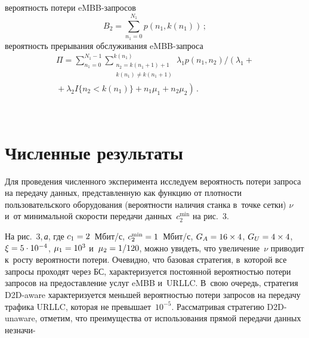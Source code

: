 \begin{multicols}{2}
\noindent
 ве\-ро\-ят\-ность потери eMBB-за\-про\-сов 
 $$
 B_2 = 
\sum\limits_{n_1=0}^{N_1}{p(n_1, k(n_1))}\,;
$$
 ве\-ро\-ят\-ность прерывания обслуживания eMBB-за\-про\-са
\begin{multline*}
\Pi = \sum\limits_{n_1=0}^{N_1 -1} \sum\limits_{\substack{ n_2 = k(n_1+1)+1 \\
    k(n_1) \ne k(n_1+1)}}^{k(n_1)}\!
\lambda_1 p(n_1,n_2)\Big/ 
\left(\lambda_1+{}\right.\\
\left.{}+\lambda_2 
I\{n_2<k(n_1)\}+n_1 \mu_1+n_2 \mu_2\right) \,.
\end{multline*}


\begin{figure*} %
\vspace*{1pt}
\begin{center}
   \mbox{%
\epsfxsize=162.604mm 
}
\end{center}
\vspace*{-9pt}
\end{figure*}

\vspace*{-9pt}

\section{Численные результаты}

Для проведения численного эксперимента исследуем ве\-ро\-ят\-ность потери запроса на 
передачу данных, представленную как функцию от плот\-ности пользовательского 
оборудования (ве\-ро\-ят\-ности наличия стан\-ка в~точ\-ке сетки) $\nu$ и~от минимальной 
ско\-рости передачи данных~$c_{2}^{\min}$ на рис.~3.

На рис.~3,\,\textit{а}, где $c_1\hm = 2$~Мбит/с, $c_{2}^{\min} \hm= 1$~Мбит/с, $G_A\hm = 16\times 4$, 
$G_U \hm= 4\times4$, $\xi\hm = 5\cdot 10^{-4}$, 
$\mu_1 \hm= 10^3$ и~$\mu_2 \hm= 1/120$, мож\-но увидеть, что увеличение~$\nu$ приводит 
к~росту вероятности потери. Очевидно, что базовая стратегия, в~которой все запросы 
проходят через БС, характеризуется по\-сто\-ян\-ной ве\-ро\-ят\-ностью потери запросов на 
предостав\-ле\-ние услуг eMBB и~URLLC. В~свою очередь, стратегия D2D-aware 
характеризуется меньшей ве\-ро\-ят\-ностью потери запросов на передачу трафика URLLC, 
которая не превышает~$10^{-5}$. Рас\-смат\-ри\-вая стратегию D2D-unaware, отметим, что 
преимущества от использования прямой передачи данных незначи-\linebreak\vspace*{-12pt}


\end{multicols}
